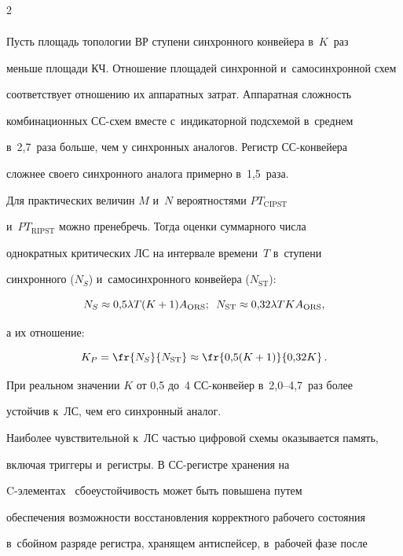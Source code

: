 \begin{multicols}{2}
\begin{align*}
  \end{align*}

  

  Пусть площадь топологии ВР ступени синхронного конвейера в~$K$~раз 

меньше площади КЧ. Отношение площадей синхронной и~самосинхронной схем 

соответствует отношению их аппаратных затрат. Аппаратная сложность 

комбинационных СС-схем вместе с~индикаторной подсхемой в~среднем 

в~2,7~раза больше, чем у синхронных аналогов. Регистр СС-кон\-вей\-ера 

сложнее своего синхронного аналога примерно в~1,5~раза.

  

  Для практических величин $M$ и~$N$ вероятностями $PT_{\mathrm{CIPST}}$ 

и~$PT_{\mathrm{RIPST}}$ можно пренебречь. Тогда оценки суммарного  числа 

однократных критических ЛС на интервале времени~$T$ в~ступени 

синхронного ($N_S$) и~самосинхронного кон\-вей\-ера ($N_{\mathrm{ST}}$):

  $$

N_S\approx 0{,}5\lambda T (K + 1)A_{\mathrm{ORS}};\enskip

N_{\mathrm{ST}}\approx0{,}32\lambda TK A_{\mathrm{ORS}},

$$

а их отношение:

$$

K_P= \fr{N_S}{N_{\mathrm{ST}}} \approx \fr{0{,}5(K+1)}{0{,}32 K}\,.

$$

При реальном значении $K$ от 0,5 до~4 СС-кон\-вей\-ер в~2,0--4,7~раз более 

устойчив к~ЛС, чем его синхронный аналог.

  

  Наиболее чувствительной к~ЛС частью цифровой схемы оказывается память, 

включая триггеры и~регистры. В СС-ре\-гист\-ре хранения на  

C-эле\-мен\-тах~\cite{6-sok} сбоеустойчивость может быть повышена путем 

обеспечения возможности восстановления корректного рабочего состояния 

в~сбойном разряде регистра, хранящем антиспейсер, в~рабочей фазе после 


\end{multicols}
